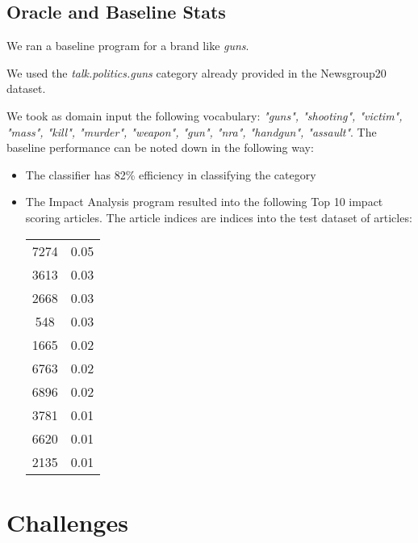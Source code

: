 \documentclass{article}
\begin{document}
\subsection {Oracle and Baseline Stats}
We ran a baseline program for a brand like \textit{guns}. 

We used the \textit{talk.politics.guns} category already provided in the Newsgroup20 dataset. 

We took as domain input the following vocabulary: \textit{"guns", "shooting", "victim", "mass", "kill", "murder", "weapon", "gun", "nra", "handgun", "assault"}. The baseline performance can be noted down in the following way:

\begin{itemize}
	\item The classifier has 82\% efficiency in classifying the category
	\item The Impact Analysis program resulted into the following Top 10 impact scoring articles. The article indices are indices into the test dataset of articles:
	
	\begin{center}
		\begin{tabular}{ c c }
			7274 & 0.05 \\ 
			3613 & 0.03 \\  
			2668 & 0.03 \\ 
			548 & 0.03 \\ 
			1665 & 0.02 \\  
			6763 & 0.02 \\ 
			6896 & 0.02 \\ 
			3781 & 0.01 \\  
			6620 & 0.01 \\ 
			2135 & 0.01 \\ 
		\end{tabular}
	\end{center}
\end{itemize}

\maketitle 

\section{Challenges} %
\end{document}

